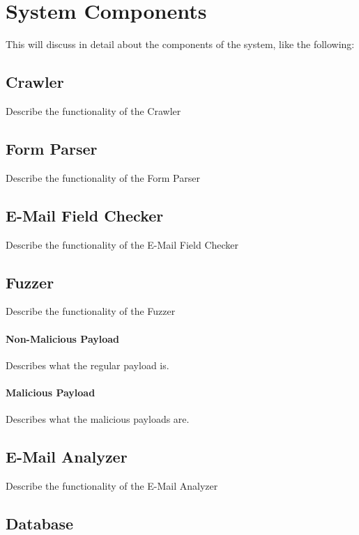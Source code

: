 \section{System Components}

This will discuss in detail about the components of the system, like the following:

\subsection{Crawler}
	Describe the functionality of the Crawler
\subsection{Form Parser}
	Describe the functionality of the Form Parser
\subsection{E-Mail Field Checker}
	Describe the functionality of the E-Mail Field Checker
\subsection{Fuzzer}
	Describe the functionality of the Fuzzer
	\paragraph{Non-Malicious Payload}
		Describes what the regular payload is.
	\paragraph{Malicious Payload}
		Describes what the malicious payloads are.
\subsection{E-Mail Analyzer}
	Describe the functionality of the E-Mail Analyzer
\subsection{Database}
